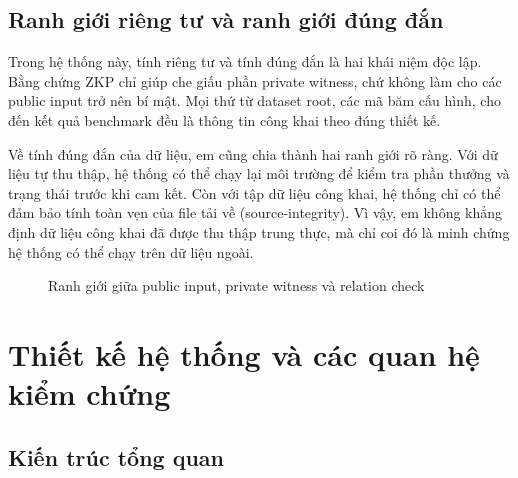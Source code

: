 \documentclass[12pt,a4paper,oneside]{report}
\begin{document}
\section{Ranh giới riêng tư và ranh giới đúng đắn}

Trong hệ thống này, tính riêng tư và tính đúng đắn là hai khái niệm độc lập. Bằng chứng ZKP chỉ giúp che giấu phần private witness, chứ không làm cho các public input trở nên bí mật. Mọi thứ từ dataset root, các mã băm cấu hình, cho đến kết quả benchmark đều là thông tin công khai theo đúng thiết kế.

Về tính đúng đắn của dữ liệu, em cũng chia thành hai ranh giới rõ ràng. Với dữ liệu tự thu thập, hệ thống có thể chạy lại môi trường để kiểm tra phần thưởng và trạng thái trước khi cam kết. Còn với tập dữ liệu công khai, hệ thống chỉ có thể đảm bảo tính toàn vẹn của file tải về (source-integrity). Vì vậy, em không khẳng định dữ liệu công khai đã được thu thập trung thực, mà chỉ coi đó là minh chứng hệ thống có thể chạy trên dữ liệu ngoài.

\begin{figure}[H]
\centering
{}
\caption{Ranh giới giữa public input, private witness và relation check}
\end{figure}

\chapter{Thiết kế hệ thống và các quan hệ kiểm chứng}

\section{Kiến trúc tổng quan}
\end{document}
